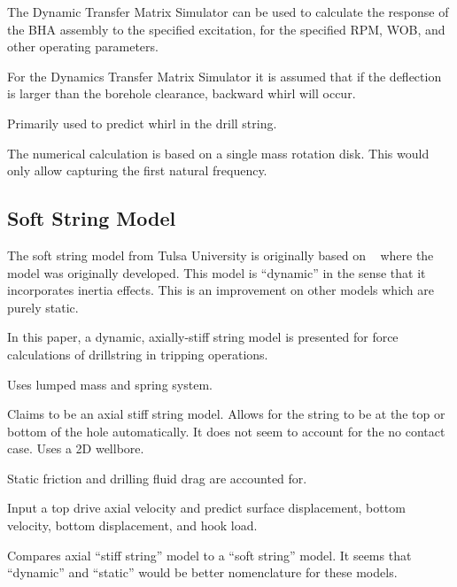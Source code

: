 The Dynamic Transfer Matrix Simulator can be used to calculate the response of the BHA assembly to the specified excitation, for the specified RPM, WOB, and other operating parameters.

For the Dynamics Transfer Matrix Simulator it is assumed that if the deflection is larger than the borehole clearance, backward whirl will occur.

Primarily used to predict whirl in the drill string.

The numerical calculation is based on a single mass rotation disk.  This would only allow capturing the first natural frequency.

\notfinished{}


\subsection{Soft String Model}
The soft string model from Tulsa University is originally based on ~\cite{ref:miska2015a} where the model was originally developed.  This model is ``dynamic'' in the sense that it incorporates inertia effects.  This is an improvement on other models which are purely static.

\notfinished{}

\cite{ref:zamanipour2018a}

In this paper, a dynamic, axially-stiff string model is presented for force calculations of drillstring in tripping operations.

Uses lumped mass and spring system.

Claims to be an axial stiff string model.  Allows for the string to be at the top or bottom of the hole automatically.  It does not seem to account for the no contact case.
Uses a 2D wellbore.

Static friction and drilling fluid drag are accounted for.

Input a top drive axial velocity and predict surface displacement, bottom velocity, bottom displacement, and hook load.

Compares axial ``stiff string'' model to a ``soft string'' model.  It seems that ``dynamic'' and ``static'' would be better nomenclature for these models.



\notfinished{}








